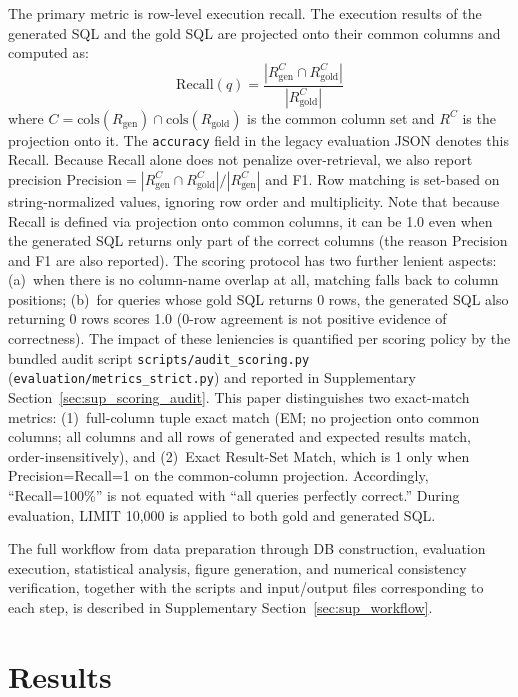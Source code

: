 The primary metric is row-level execution recall. The execution results of the generated SQL and the gold SQL are projected onto their common columns and computed as:
\begin{equation}
  \mathrm{Recall}(q) = \frac{|R_\text{gen}^{C} \cap R_\text{gold}^{C}|}{|R_\text{gold}^{C}|}
  \label{eq:column_aware}
\end{equation}
where $C = \text{cols}(R_\text{gen}) \cap \text{cols}(R_\text{gold})$ is the common column set and $R^C$ is the projection onto it. The \texttt{accuracy} field in the legacy evaluation JSON denotes this Recall. Because Recall alone does not penalize over-retrieval, we also report precision $\mathrm{Precision}=|R_\text{gen}^{C}\cap R_\text{gold}^{C}|/|R_\text{gen}^{C}|$ and F1. Row matching is set-based on string-normalized values, ignoring row order and multiplicity. Note that because Recall is defined via projection onto common columns, it can be 1.0 even when the generated SQL returns only part of the correct columns (the reason Precision and F1 are also reported). The scoring protocol has two further lenient aspects: (a)~when there is no column-name overlap at all, matching falls back to column positions; (b)~for queries whose gold SQL returns 0 rows, the generated SQL also returning 0 rows scores 1.0 (0-row agreement is not positive evidence of correctness). The impact of these leniencies is quantified per scoring policy by the bundled audit script \texttt{scripts/audit\_scoring.py} (\texttt{evaluation/metrics\_strict.py}) and reported in Supplementary Section~\ref{sec:sup_scoring_audit}. This paper distinguishes two exact-match metrics: (1)~full-column tuple exact match (EM; no projection onto common columns; all columns and all rows of generated and expected results match, order-insensitively), and (2)~Exact Result-Set Match, which is 1 only when Precision=Recall=1 on the common-column projection. Accordingly, ``Recall=100\%'' is not equated with ``all queries perfectly correct.'' During evaluation, LIMIT 10{,}000 is applied to both gold and generated SQL.

The full workflow from data preparation through DB construction, evaluation execution, statistical analysis, figure generation, and numerical consistency verification, together with the scripts and input/output files corresponding to each step, is described in Supplementary Section~\ref{sec:sup_workflow}.

\section{Results}\label{sec:results}
